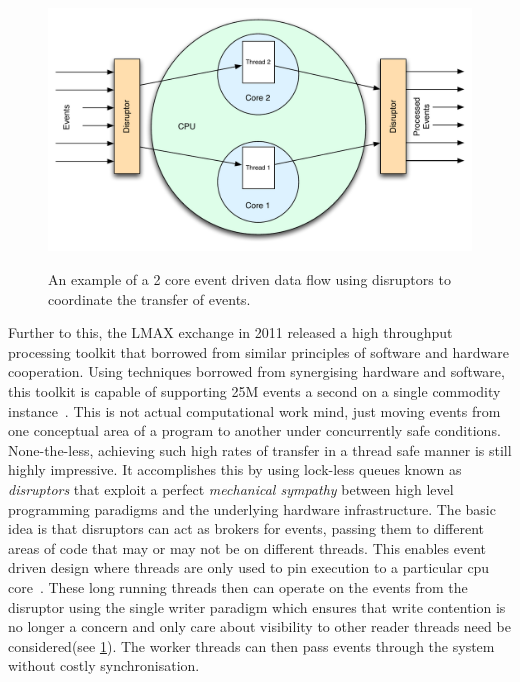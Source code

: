 \documentclass[a4paper,11pt]{scrreprt}
\begin{document}
\begin{figure}[h!]

\centering
\caption{An example of a 2 core event driven data flow using disruptors to coordinate the transfer of events.}
\includegraphics[scale=0.65] {disruptor-ex.pdf}
\label{fig:disruptor-ex}
\end{figure}

Further to this, the LMAX exchange in 2011 released a high throughput processing toolkit that borrowed from similar principles of software and hardware cooperation. Using techniques borrowed from synergising hardware and software, this toolkit is capable of supporting 25M events a second on a single commodity instance~\cite{disruptor-paper}. This is not actual computational work mind, just moving events from one conceptual area of a program to another under concurrently safe conditions. None-the-less, achieving such high rates of transfer in a thread safe manner is still highly impressive. It accomplishes this by using lock-less queues known as \textit{disruptors} that exploit a perfect \textit{mechanical sympathy} between high level programming paradigms and the underlying hardware infrastructure. The basic idea is that disruptors can act as brokers for events, passing them to different areas of code that may or may not be on different threads. This enables event driven design where threads are only used to pin execution to a particular \acrshort{cpu} core~\cite{processor-affinity}. These long running threads then can operate on the events from the disruptor using the single writer paradigm which ensures that write contention is no longer a concern and only care about visibility to other reader threads need be considered(see \ref{fig:disruptor-ex}). The worker threads can then pass events through the system without costly synchronisation.
\end{document}
